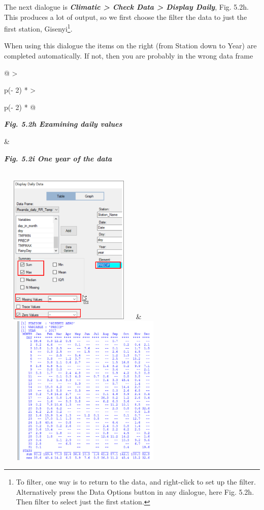 \documentclass[
  letterpaper,
  DIV=11,
  numbers=noendperiod]{scrreprt}
\begin{document}
The next dialogue is \textbf{\emph{Climatic \textgreater{} Check Data
\textgreater{} Display Daily}}, Fig. 5.2h. This produces a lot of
output, so we first choose the filter the data to just the first
station, Gisenyi\footnote{To filter, one way is to return to the data,
  and right-click to set up the filter. Alternatively press the Data
  Options button in any dialogue, here Fig. 5.2h. Then filter to select
  just the first station.}.

When using this dialogue the items on the right (from Station down to
Year) are completed automatically. If not, then you are probably in the
wrong data frame

\begin{longtable}[]{@{}
  >{\raggedright\arraybackslash}p{(\columnwidth - 2\tabcolsep) * }
  >{\raggedright\arraybackslash}p{(\columnwidth - 2\tabcolsep) * }@{}}
\toprule\noalign{}
\begin{minipage}[b]{\linewidth}\raggedright
\textbf{\emph{Fig. 5.2h Examining daily values}}
\end{minipage} & \begin{minipage}[b]{\linewidth}\raggedright
\textbf{\emph{Fig. 5.2i One year of the data}}
\end{minipage} \\
\midrule\noalign{}
\endhead
\bottomrule\noalign{}
\endlastfoot
\includegraphics[width=2.65607in,height=2.83047in]{figures/Fig5.2h.png}
&
\includegraphics[width=3.33715in,height=2.83944in]{figures/Fig5.2i.png} \\
\end{longtable}
\end{document}
